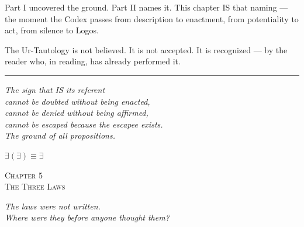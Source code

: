 \documentclass[10pt, openany, oneside]{book}
\renewcommand{\large}{\fontsize{11.5}{14}\selectfont}
\renewcommand{\huge}{\fontsize{17}{21}\selectfont}
\begin{document}
Part I uncovered the ground. Part II names it. This chapter IS that naming --- the moment the Codex passes from description to enactment, from potentiality to act, from silence to Logos.

The Ur-Tautology is not believed. It is not accepted. It is recognized --- by the reader who, in reading, has already performed it.

\vspace{2em}

\begin{center}
    \rule{0.15\textwidth}{0.3pt}
\end{center}

\vspace{0.5em}

\begin{center}
    \itshape
    The sign that IS its referent\\
    cannot be doubted without being enacted,\\
    cannot be denied without being affirmed,\\
    cannot be escaped because the escapee exists.\\[0.8em]
    The ground of all propositions.
\end{center}

\vspace{0.5em}

\begin{center}
    \textbf{$\exists(\exists) \equiv \exists$}
\end{center}


%
%
%

\newpage

\begin{center}
    {\huge\scshape Chapter 5}\\[0.3em]
    {\large\scshape The Three Laws}
\end{center}

\vspace{1.5em}

\begin{center}
    \itshape
    The laws were not written.\\
    Where were they before anyone thought them?
\end{center}
\end{document}
